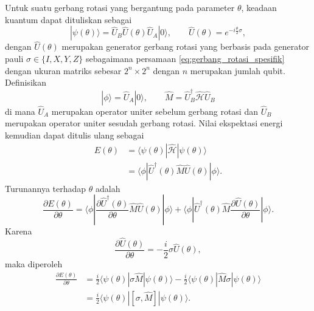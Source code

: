 Untuk suatu gerbang rotasi yang bergantung pada parameter $\theta$, keadaan kuantum dapat dituliskan sebagai
\begin{equation}
    |\psi(\theta)\rangle
    =
    \hat{U}_B
    \hat{U}(\theta)
    \hat{U}_A
    |0\rangle,
    \qquad
    \hat{U}(\theta)
    =
    e^{-i\frac{\theta}{2}\sigma},
\end{equation}
dengan $\hat U(\theta)$ merupakan generator gerbang rotasi yang berbasis pada generator pauli $\sigma\in\{I,X,Y,Z\}$ sebagaimana persamaan \eqref{eq:gerbang_rotasi_spesifik} dengan ukuran matriks sebesar $2^n\times2^n$ dengan $n$ merupakan jumlah qubit. Definisikan
\begin{equation}
    |\phi\rangle=\hat{U}_A|0\rangle,
    \qquad
    \hat{M}
    =
    \hat{U}_B^\dagger
    \hat{\mathcal{H}}
    \hat{U}_B
\end{equation}
di mana $\hat U_A$ merupakan operator uniter sebelum gerbang rotasi dan $\hat U_B$ merupakan operator uniter sesudah gerbang rotasi. Nilai ekspektasi energi kemudian dapat ditulis ulang sebagai
\begin{equation}
    \begin{split}
    E(\theta)
    &=
    \langle \psi(\theta)|
    \hat{\mathcal{H}}
    |\psi(\theta)\rangle \\
    &=
    \langle \phi|
    \hat{U}^\dagger(\theta)
    \hat{M}
    \hat{U}(\theta)
    |\phi\rangle.
    \end{split}
\end{equation}
Turunannya terhadap $\theta$ adalah
\begin{equation}
    \frac{\partial E(\theta)}{\partial \theta}
    =
    \langle \phi|
    \frac{\partial \hat{U}^{\dagger}(\theta)}{\partial \theta}
    \hat{M}
    \hat{U}(\theta)
    |\phi\rangle
    +
    \langle \phi|
    \hat{U}^{\dagger}(\theta)
    \hat{M}
    \frac{\partial \hat{U}(\theta)}{\partial \theta}
    |\phi\rangle.
\end{equation}
Karena
\begin{equation}
    \frac{\partial \hat{U}(\theta)}{\partial \theta}
    =
    -\frac{i}{2}\sigma \hat{U}(\theta),
\end{equation}
maka diperoleh
\begin{equation}
    \begin{split}
    \frac{\partial E(\theta)}{\partial \theta}
    &=
    \frac{i}{2}
    \langle \psi(\theta)|
    \sigma \hat{M}
    |\psi(\theta)\rangle
    -
    \frac{i}{2}
    \langle \psi(\theta)|
    \hat{M}\sigma
    |\psi(\theta)\rangle \\
    &=
    \frac{i}{2}
    \langle \psi(\theta)|
    [\sigma,\hat{M}]
    |\psi(\theta)\rangle.
    \end{split}
\end{equation}

